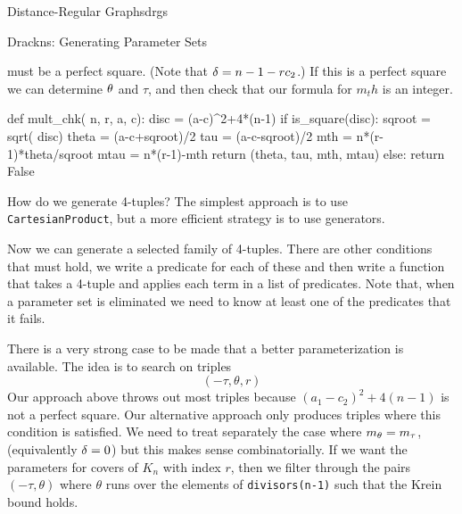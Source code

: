 \begin{chap}{Distance-Regular Graphs}{drgs}
\begin{sect}{Drackns: Generating Parameter Sets}
\begin{para}
must be a perfect square. (Note that $\delta=n-1-rc_2$.) If this is a perfect square
we can determine $\theta$ and $\tau$, and then check that our formula for $m_th$
is an integer.
\end{para}
%
\begin{sagecode}
\begin{sageinput}
def mult_chk( n, r, a, c):
    disc = (a-c)^2+4*(n-1)
    if is_square(disc):
        sqroot = sqrt( disc)
        theta = (a-c+sqroot)/2
        tau = (a-c-sqroot)/2
        mth = n*(r-1)*theta/sqroot
        mtau = n*(r-1)-mth
        return (theta, tau, mth, mtau)
    else:
        return False
\end{sageinput}
\end{sagecode}
%
\begin{para}
How do we generate 4-tuples? The simplest approach is to use \verb|CartesianProduct|,
but a more efficient strategy is to use generators.
\end{para}
%
\begin{para}
Now we can generate a selected family of 4-tuples. There are other conditions
that must hold, we write a predicate for each of these and then write
a function that takes a 4-tuple and applies each term in a list of
predicates. Note that, when a parameter set is eliminated we need to know
at least one of the predicates that it fails.
\end{para}
%
\begin{para}
There is a very strong case to be made that a better parameterization is available.
The idea is to search on triples
\[
    (-\tau,\theta, r)
\]
Our approach above throws out most triples because $(a_1-c_2)^2+4(n-1)$ is not
a perfect square. Our alternative approach only produces triples where
this condition is satisfied. We need to treat separately the case where
$m_\theta=m_\tau$, (equivalently $\delta=0$) but this makes sense combinatorially. 
If we want the parameters for covers of $K_n$ with index $r$, then we filter
through the pairs $(-\tau, \theta)$ where $\theta$ runs over the elements
of \verb|divisors(n-1)| such that the Krein bound holds.
\end{para}
%
\end{sect}
%
\end{chap}